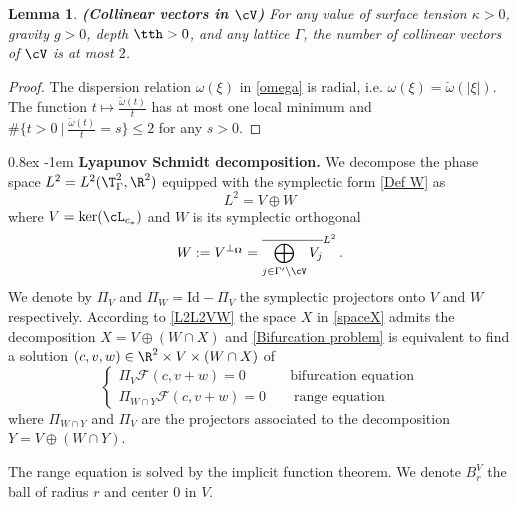 \documentclass[11pt,a4paper,reqno]{article}
\makeatletter
\renewcommand{\paragraph}{%
  \@startsection{paragraph}{4}{\z@}%
  {0.8ex}  %
  {-1em}   %
  {\normalfont\bfseries}%
}
\numberwithin{equation}{section}
\newtheorem{lemma}[theorem]{Lemma}
\theoremstyle{definition}
\makeatother
\begin{document}
\begin{lemma}\label{lem:coll}
{\bf (Collinear vectors in $\cV $)} For any value of surface tension   
$\kappa>0$,  gravity  $g>0$, depth 
$\tth>0$,  and any lattice $ \Gamma $, the number of collinear vectors of $ \cV$ is at most $ 2 $.
\end{lemma}

\begin{proof}
The dispersion relation $\omega (\xi) $ 
in \eqref{omega} 
is radial, i.e. $\omega(\xi)= 
\breve \omega(|\xi |)$. The function
 $ t\mapsto \frac{\breve \omega(t)}t$ has at most one local minimum and 
    $
            \#\big\{t > 0  \ \big| \ \frac{\breve \omega(t)}t=s \big\}\leq 2 $
            for any $ s > 0  
     $. 
\end{proof}

\paragraph{\bf Lyapunov Schmidt  decomposition.}
We decompose  
the phase space $ L^2 =  L^2 (\T^2_\Gamma, \R^2) $
equipped with the symplectic form \eqref{Def W} 
as 
\begin{equation}\label{L2L2VW}
L^2  = V \oplus W  
\end{equation}
where $V=\ker(\cL_{c_*})$ and $ W $ is its symplectic orthogonal 
\begin{equation}\label{siort}
W:= V^{\bot_{\boldsymbol{\Omega}}} = \overline{\bigoplus_{
j \in \Gamma' \setminus \cV} V_j }^{L^2} \, . 
\end{equation}
We denote by $ \Pi_V $ and $ \Pi_W= \text{Id} -\Pi_V$
the symplectic projectors onto $V$ and $W$ respectively.
According to  \eqref{L2L2VW} 
the space $X$  in \eqref{spaceX} 
admits the decomposition  
$ X = V\oplus (W\cap X) $ and  \eqref{Bifurcation problem} is equivalent to 
find a solution $ (c,v,w)\in \R^2 \times V \times (W\cap X) $ of 
\[
    \begin{cases}
     \Pi_{ V} {\mathcal F}(c,v+w) = 0 \qquad \quad \, \text{bifurcation equation}\\
        \Pi_{W\cap Y} {\mathcal F}(c,v+w)=0 \qquad \text{range equation}
    \end{cases}
\]
where $\Pi_{W\cap Y}$ and $\Pi_{V}$ are the projectors associated to the  decomposition  
$Y = V \oplus (W \cap Y) $.

The  range equation is solved by the implicit function theorem. We denote $B_r^V $ the ball of radius $r$ and center 0 in $V$.
\end{document}
